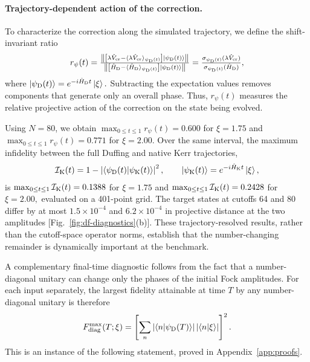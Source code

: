 \documentclass[pra,twocolumn,superscriptaddress,nofootinbib,floatfix]{revtex4-2}
\theoremstyle{remark}
\begin{document}
\paragraph{Trajectory-dependent action of the correction.}
To characterize the correction along the simulated trajectory, we define the shift-invariant ratio
\begin{align}
r_\psi(t)=\tfrac{\left\|\left[\lambda\hat V_{\rm cr}-\langle\lambda\hat V_{\rm cr}\rangle_{\psi_{\rm D}(t)}\right]\ket{\psi_{\rm D}(t)}\right\|}{\left\|\left[\hat H_{\rm D}-\langle\hat H_{\rm D}\rangle_{\psi_{\rm D}(t)}\right]\ket{\psi_{\rm D}(t)}\right\|}=\tfrac{\sigma_{\psi_{\rm D}(t)}(\lambda\hat V_{\rm cr})}{\sigma_{\psi_{\rm D}(t)}(\hat H_{\rm D})},
\label{eq:df-state-ratio}
\end{align}
where
\(\ket{\psi_{\rm D}(t)}=e^{-i\hat H_{\rm D}t}\ket{\xi}.\)
Subtracting the expectation values removes components that generate only an overall phase. Thus, \(r_\psi(t)\) measures the relative projective action of the correction on the state being evolved.

Using \(N=80\), we obtain $\max_{0\leq t\leq1}r_\psi(t)=0.600$ for $\xi=1.75$ and $\max_{0\leq t\leq1}r_\psi(t)=0.771$ for $\xi=2.00.$
Over the same interval, the maximum infidelity between the full Duffing and native Kerr trajectories,
\begin{align}
\mathcal I_{\rm K}(t)=1-\left|\braket{\psi_{\rm D}(t)}{\psi_{\rm K}(t)}\right|^2,\qquad\ket{\psi_{\rm K}(t)}=e^{-i\hat H_{\rm K}t}\ket{\xi},
\label{eq:df-native-infidelity}
\end{align}
is
\(\max_{0\leq t\leq1}\mathcal I_{\rm K}(t)=0.1388\) for $\xi=1.75$ and
$\max_{0\leq t\leq1}\mathcal I_{\rm K}(t)=0.2428$ for $\xi=2.00,$ evaluated on a 401-point grid. The target states at cutoffs 64 and 80 differ by at most \(1.5\times10^{-4}\) and \(6.2\times10^{-4}\) in projective distance at the two amplitudes [Fig.~\ref{fig:df-diagnostics}(b)].
These trajectory-resolved results, rather than the cutoff-space operator norms, establish that the number-changing remainder is dynamically important at the benchmark.

A complementary final-time diagnostic follows from the fact that a number-diagonal unitary can change only the phases of the initial Fock amplitudes. For each input separately, the largest fidelity attainable at time \(T\) by any number-diagonal unitary is therefore
\begin{align}
F_{\rm diag}^{\max}(T;\xi)=\left[\sum_n\left|\braket{n}{\psi_{\rm D}(T)}\right|\left|\braket{n}{\xi}\right|\right]^2 .
\label{eq:df-diagonal-ceiling}
\end{align}
This is an instance of the following statement, proved in Appendix~\ref{app:proofs}.
\end{document}
